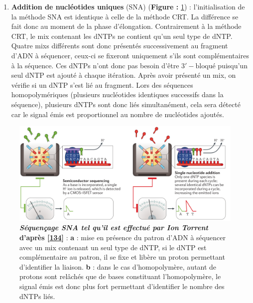 \documentclass[12pt,a4paper,twoside]{ugathesis}
\providecommand{\tightlist}{%
  \setlength{\itemsep}{0pt}\setlength{\parskip}{0pt}}
\theoremstyle{definition}
\theoremstyle{definition}
\theoremstyle{definition}
\theoremstyle{remark}
\begin{document}
\newpage

\begin{enumerate}
\def\labelenumi{\alph{enumi}.}
\setcounter{enumi}{1}
\tightlist
\item
  \textbf{Addition de nucléotides uniques} (SNA) (\textbf{Figure :
  }\ref{fig:pictsnaSeq}) : l'initialisation de la méthode SNA est
  identique à celle de la méthode CRT. La différence se fait donc au
  moment de la phase d'élongation. Contrairement à la méthode CRT, le
  mix contenant les dNTPs ne contient qu'un seul type de dNTP. Quatre
  mixs différents sont donc présentés successivement au fragment d'ADN à
  séquencer, ceux-ci se fixeront uniquement s'ils sont complémentaires à
  la séquence. Ces dNTPs n'ont donc pas besoin d'être
  \(\mathrm{3'-bloqué}\) puisqu'un seul dNTP est ajouté à chaque
  itération. Après avoir présenté un mix, on vérifie si un dNTP s'est
  lié au fragment. Lors des séquences homopolymériques (plusieurs
  nucléotides identiques successifs dans la séquence), plusieurs dNTPs
  sont donc liés simultanément, cela sera détecté car le signal émis est
  proportionnel au nombre de nucléotides ajoutés.
\end{enumerate}

\begin{figure}

{\centering \includegraphics[scale=.26]{figure/SNA_seq_ionTorrent} 

}

\caption[Séquençage SNA tel qu'il est effectué par Ion Torrent]{\textbf{\emph{Séquençage SNA tel qu'il est effectué par
Ion Torrent} d'après {[}\protect\hyperlink{ref-Goodwin2016}{134}{]}} :
\textbf{a} : mise en présence du patron d'ADN à séquencer avec un mix
contenant un seul type de dNTP, si le dNTP est complémentaire au patron,
il se fixe et libère un proton permettant d'identifier la liaison.
\textbf{b} : dans le cas d'homopolymère, autant de protons sont relâchés
que de bases constituant l'homopolymère, le signal émis est donc plus
fort permettant d'identifier le nombre des dNTPs liés.}\label{fig:pictsnaSeq}
\end{figure}
\end{document}
